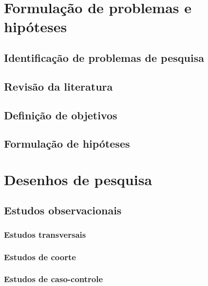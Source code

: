 \documentclass[
]{book}
\begin{document}
\chapter{Formulação de problemas e hipóteses}\label{formulauxe7uxe3o-de-problemas-e-hipuxf3teses}

\section{Identificação de problemas de pesquisa}\label{identificauxe7uxe3o-de-problemas-de-pesquisa}

\section{Revisão da literatura}\label{revisuxe3o-da-literatura}

\section{Definição de objetivos}\label{definiuxe7uxe3o-de-objetivos}

\section{Formulação de hipóteses}\label{formulauxe7uxe3o-de-hipuxf3teses}

\chapter{Desenhos de pesquisa}\label{desenhos-de-pesquisa}

\section{Estudos observacionais}\label{estudos-observacionais}

\subsection{Estudos transversais}\label{estudos-transversais}

\subsection{Estudos de coorte}\label{estudos-de-coorte}

\subsection{Estudos de caso-controle}\label{estudos-de-caso-controle}
\end{document}
